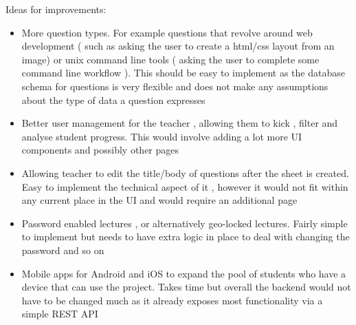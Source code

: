 Ideas for improvements:
\begin{itemize}
	\item More question types. For example questions that revolve around web development ( such as asking the user to create a html/css layout from an image) or unix command line tools ( asking the user to complete some command line workflow ). This should be easy to implement as the database schema for questions is very flexible and does not make any assumptions about the type of data a question expresses
	\item Better user management for the teacher , allowing them to kick , filter and analyse student progress. This would involve adding a lot more UI components and possibly other pages
	\item Allowing teacher to edit the title/body of questions after the sheet is created. Easy to implement the technical aspect of it , however it would not fit within any current place in the UI and would require an additional page
	\item Password enabled lectures , or alternatively geo-locked lectures. Fairly simple to implement but needs to have extra logic in place to deal with changing the password and so on
	\item Mobile apps for Android and iOS to expand the pool of students who have a device that can use the project. Takes time but overall the backend would not have to be changed much as it already exposes most functionality via a simple REST API
\end{itemize}
